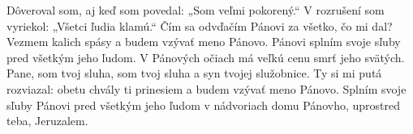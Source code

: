 Dôveroval som, aj keď som povedal:
„Som veľmi pokorený.“
\versseparator
V rozrušení som vyriekol:
„Všetci ľudia klamú.“
\versseparator
Čím sa odvďačím Pánovi
za všetko, čo mi dal?
\versseparator
Vezmem kalich spásy
a budem vzývať meno Pánovo.
\versseparator
Pánovi splním svoje sľuby
pred všetkým jeho ľudom.
V Pánových očiach má veľkú cenu
smrť jeho svätých.
\versseparator
Pane, som tvoj sluha,
som tvoj sluha a syn tvojej služobnice.
\versseparator
Ty si mi putá rozviazal:
obetu chvály ti prinesiem
a budem vzývať meno Pánovo.
\versseparator
Splním svoje sľuby Pánovi
pred všetkým jeho ľudom
v nádvoriach domu Pánovho,
uprostred teba, Jeruzalem.